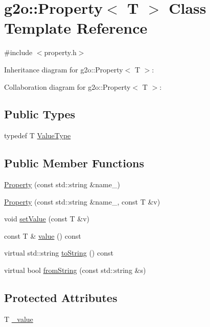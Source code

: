 \hypertarget{classg2o_1_1Property}{}\section{g2o\+:\+:Property$<$ T $>$ Class Template Reference}
\label{classg2o_1_1Property}


{\ttfamily \#include $<$property.\+h$>$}



Inheritance diagram for g2o\+:\+:Property$<$ T $>$\+:


Collaboration diagram for g2o\+:\+:Property$<$ T $>$\+:
\subsection*{Public Types}
\begin{DoxyCompactItemize}
\item 
typedef T \hyperlink{classg2o_1_1Property_a0387bb74c147b54b8fa4f4cd5629fbf8}{Value\+Type}
\end{DoxyCompactItemize}
\subsection*{Public Member Functions}
\begin{DoxyCompactItemize}
\item 
\hyperlink{classg2o_1_1Property_a15e39f5b08067cff86d2a4f5c838aeee}{Property} (const std\+::string \&name\+\_\+)
\item 
\hyperlink{classg2o_1_1Property_a888c7b06876668a0132e32a2a0e28311}{Property} (const std\+::string \&name\+\_\+, const T \&v)
\item 
void \hyperlink{classg2o_1_1Property_a438d1ca338ce8c3a371654023200068d}{set\+Value} (const T \&v)
\item 
const T \& \hyperlink{classg2o_1_1Property_aefa3e7a5fcb2c8e061ecb07485f1371c}{value} () const 
\item 
virtual std\+::string \hyperlink{classg2o_1_1Property_aaa5c2e380ceca424de92d16f1d92fad6}{to\+String} () const 
\item 
virtual bool \hyperlink{classg2o_1_1Property_a5c0a6eacc67e98d4f0b3fd9fe856dbbe}{from\+String} (const std\+::string \&s)
\end{DoxyCompactItemize}
\subsection*{Protected Attributes}
\begin{DoxyCompactItemize}
\item 
T \hyperlink{classg2o_1_1Property_ae51b1fe0e0a1f0d9a2bcbef7ea3afcf7}{\+\_\+value}
\end{DoxyCompactItemize}


